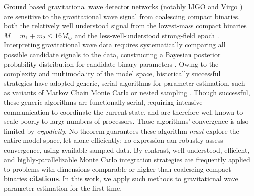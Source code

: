 \label{sec:introduction}

Ground based gravitational wave detector networks (notably LIGO \cite{gw-detectors-LIGO-original-preferred} and Virgo
\cite{gw-detectors-VIRGO-original-preferred})  are sensitive to the gravitational wave signal from coalescing compact
binaries, both the relatively well understood signal from  the lowest-mass compact binaries
$M=m_1+m_2\le 16 M_\odot$
\cite{2003PhRvD..67j4025B,2004PhRvD..70j4003B,2004PhRvD..70f4028D,BCV:PTF,2005PhRvD..71b4039K,2005PhRvD..72h4027B,2006PhRvD..73l4012K,2007MNRAS.374..721T,2008PhRvD..78j4007H,gr-astro-eccentric-NR-2008,gw-astro-mergers-approximations-SpinningPNHigherHarmonics,gw-astro-PN-Comparison-AlessandraSathya2009}
and the less-well-understood strong-field epoch .    
%
Interpreting gravitational wave data requires systematically comparing all possible candidate signals to the data,
constructing a Bayesian posterior probability distribution for candidate binary parameters \citeMCMC{}.   
%
Owing to the complexity and multimodality of the model space, historically successful strategies have adopted  generic, serial
algorithms for parameter estimation, such as variants of Markov Chain Monte Carlo or nested sampling
\cite{2011RvMP...83..943V,gw-astro-PE-lalinference-v1}.  
Though successful, these generic algorithms are functionally serial, requiring intensive communication to coordinate the
current state, and are therefore well-known to scale poorly to large numbers of processors.  
%
These algorithms' convergence is also limited by \emph{ergodicity}.  No theorem guarantees these algorithm \emph{must}
 explore the entire model space, let alone efficiently; no expression can robustly assess convergence, using available
 sampled data.  
%
By contrast, well-understood, efficient, and highly-parallelizable Monte Carlo integration strategies are frequently applied to problems with dimensions comparable or
higher than coalescing compact binaries \textbf{citations}.    In this work, we apply such methods to gravitational wave
parameter estimation for the first time.  
%


